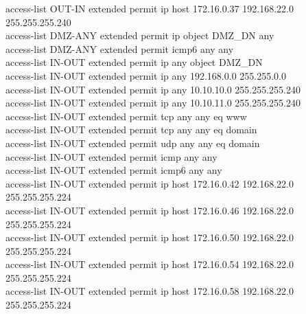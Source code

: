 \documentclass[12pt,a4paper]{report}
\begin{document}
{\hspace*{1cm}access-list OUT-IN extended permit ip host 172.16.0.37 192.168.22.0 255.255.255.240\\
\hspace*{1cm}access-list DMZ-ANY extended permit ip object DMZ\_DN any\\
\hspace*{1cm}access-list DMZ-ANY extended permit icmp6 any any \\
\hspace*{1cm}access-list IN-OUT extended permit ip any object DMZ\_DN\\
\hspace*{1cm}access-list IN-OUT extended permit ip any 192.168.0.0 255.255.0.0 \\
\hspace*{1cm}access-list IN-OUT extended permit ip any 10.10.10.0 255.255.255.240\\
\hspace*{1cm}access-list IN-OUT extended permit ip any 10.10.11.0 255.255.255.240 \\
\hspace*{1cm}access-list IN-OUT extended permit tcp any any eq www\\
\hspace*{1cm}access-list IN-OUT extended permit tcp any any eq domain \\
\hspace*{1cm}access-list IN-OUT extended permit udp any any eq domain \\
\hspace*{1cm}access-list IN-OUT extended permit icmp any any\\
\hspace*{1cm}access-list IN-OUT extended permit icmp6 any any\\
\hspace*{1cm}access-list IN-OUT extended permit ip host 172.16.0.42 192.168.22.0 255.255.255.224\\
\hspace*{1cm}access-list IN-OUT extended permit ip host 172.16.0.46 192.168.22.0 255.255.255.224\\
\hspace*{1cm}access-list IN-OUT extended permit ip host 172.16.0.50 192.168.22.0 255.255.255.224\\
\hspace*{1cm}access-list IN-OUT extended permit ip host 172.16.0.54 192.168.22.0 255.255.255.224\\
\hspace*{1cm}access-list IN-OUT extended permit ip host 172.16.0.58 192.168.22.0 255.255.255.224\\
}
\end{document}
